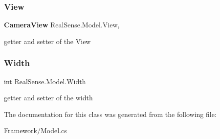 \subsubsection{View}
{\footnotesize\ttfamily \textbf{ Camera\+View} Real\+Sense.\+Model.\+View\hspace{0.3cm}{\ttfamily [get]}, {\ttfamily [set]}}

getter and setter of the View \mbox{\label{class_real_sense_1_1_model_a20e2b5bc79da762b436b75ddd28f63b7}} 
\subsubsection{Width}
{\footnotesize\ttfamily int Real\+Sense.\+Model.\+Width\hspace{0.3cm}{\ttfamily [get]}}

getter and setter of the width 

The documentation for this class was generated from the following file\+:\begin{DoxyCompactItemize}
\item 
Framework/Model.\+cs\end{DoxyCompactItemize}
